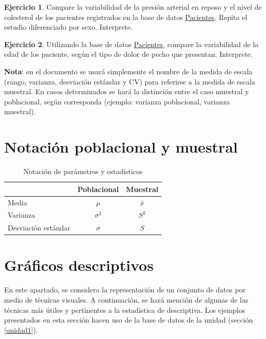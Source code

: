 \documentclass[
  11pt,
]{book}
\theoremstyle{definition}
\theoremstyle{definition}
\theoremstyle{definition}
\newtheorem{exercise}{Ejercicio}[chapter]
\theoremstyle{definition}
\theoremstyle{remark}
\begin{document}
\begin{exercise}
Compare la variabilidad de la presión arterial en reposo y el nivel de colesterol de los pacientes registrados en la base de datos \hyperref[Pacientes]{Pacientes}. Repita el estudio diferenciado por sexo. Interprete.
\end{exercise}

\begin{exercise}
Utilizando la base de datos \hyperref[Pacientes]{Pacientes}, compare la variabilidad de la edad de los paciente, según el tipo de dolor de pecho que presentan. Interprete.
\end{exercise}

\textbf{Nota}: en el documento se usará simplemente el nombre de la medida de escala (rango, varianza, desviación estándar y CV) para referirse a la medida de escala muestral. En casos determinados se hará la distinción entre el caso muestral y poblacional, según corresponda (ejemplo: varianza poblacional, varianza muestral).

\section{Notación poblacional y muestral}\label{notaciuxf3n-poblacional-y-muestral}

\begin{table}[H]
\centering
\caption{\label{tab:notacion}Notación de parámetros y estadísticos}
\centering
\begin{tabular}[t]{lcc}
\toprule
  & Poblacional & Muestral\\
\midrule
Media & $\mu$ & $\bar{x}$\\
Varianza & $\sigma^2$ & $S^2$\\
Desviación estándar & $\sigma$ & $S$\\
\bottomrule
\end{tabular}
\end{table}

\section{Gráficos descriptivos}\label{gruxe1ficos-descriptivos}

En este apartado, se considera la representación de un conjunto de datos por medio de técnicas visuales. A continuación, se hará mención de algunas de las técnicas más útiles y pertinentes a la estadística de descriptiva. Los ejemplos presentados en esta sección hacen uso de la base de datos de la unidad (sección \ref{unidad1}).
\end{document}
